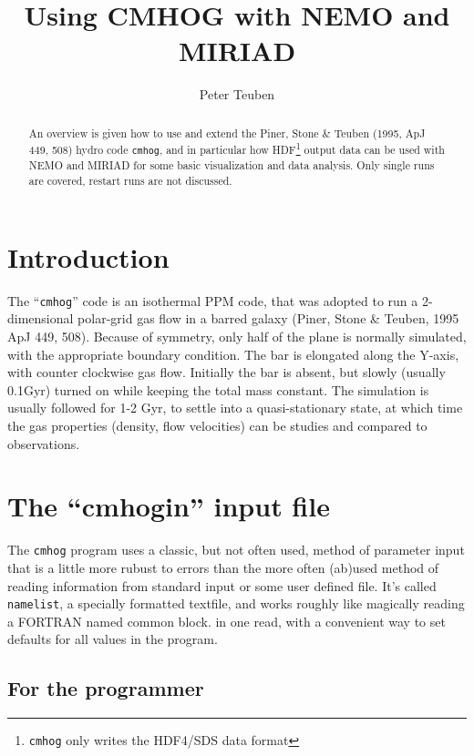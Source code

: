 \documentclass[10pt,dvips]{article}
\title{Using CMHOG with NEMO and MIRIAD}
\author{Peter Teuben}
\begin{document}
\maketitle


\begin{abstract}

An overview is given how to use and extend 
the Piner, Stone \& Teuben (1995, ApJ 449, 508) hydro code
{\tt cmhog}, and in particular how 
HDF\footnote{{\tt cmhog} only writes the HDF4/SDS data format}
output data can be used with
NEMO and MIRIAD for some basic visualization and data analysis.
Only single runs are covered, restart runs are not discussed.

\end{abstract}

\section{Introduction}

The ``{\tt cmhog}'' code is an isothermal PPM code, 
that was adopted to run a 2-dimensional polar-grid gas flow in a 
barred galaxy (Piner, Stone \& Teuben, 1995 ApJ 449, 508).
Because of symmetry, only half of the plane is normally
simulated, with the appropriate  boundary condition.
The bar is elongated along the Y-axis, with 
counter clockwise gas flow. Initially the bar is absent, but
slowly (usually 0.1Gyr) turned on while keeping
the total mass constant. The simulation
is usually followed for 1-2 Gyr, to settle into a quasi-stationary
state, at which time the gas properties (density, flow velocities)
can be studies and compared to observations.

\section{The ``cmhogin'' input file}

The {\tt cmhog} program uses a classic, but not often used, method of parameter input
that is a little more rubust to errors than the more often (ab)used method
of reading information from standard input or some user defined file.
It's called {\tt namelist},
a specially formatted textfile, 
and works roughly like magically reading a FORTRAN named common block.
in one read, with a convenient way to set defaults for all values
in the program.

\subsection{For the programmer}
\end{document}
